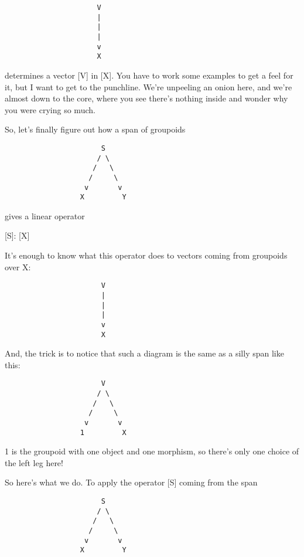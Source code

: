\begin{verbatim}
                      V
                      |
                      |
                      |
                      v
                      X
\end{verbatim}
    
determines a vector [V] in [X].  You have to work some examples
to get a feel for it, but I want to get to the punchline.  We're 
unpeeling an onion here, and we're almost down to the core, where 
you see there's nothing inside and wonder why you were crying so much.

So, let's finally figure out how a span of groupoids

\begin{verbatim}
                       S
                      / \
                     /   \
                    /     \
                   v       v
                  X         Y
\end{verbatim}
    
gives a linear operator 

[S]: [X] \to  [Y] 

It's enough to know what this operator does to vectors 
coming from groupoids over X:

\begin{verbatim}
                       V
                       |
                       |
                       |
                       v
                       X
\end{verbatim}
    
And, the trick is to notice that such a diagram is the same as
a silly span like this:

\begin{verbatim}
                       V
                      / \
                     /   \
                    /     \
                   v       v
                  1         X
\end{verbatim}
    
1 is the groupoid with one object and one morphism, so there's 
only one choice of the left leg here!

So here's what we do.  To apply the operator [S] coming from 
the span

\begin{verbatim}
                       S
                      / \
                     /   \
                    /     \
                   v       v
                  X         Y
\end{verbatim}
    
